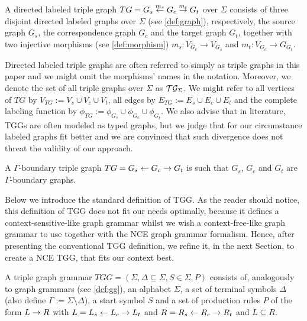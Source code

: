 \documentclass[runningheads]{llncs}
\begin{document}
\begin{definition}
	A directed labeled triple graph $TG = G_s \overset{m_s}{\leftarrow} G_c \overset{m_t}{\rightarrow} G_t$ over $\Sigma$ consists of three disjoint directed labeled graphs over $\Sigma$ (see \ref{def:graph}), respectively, the source graph $G_s$, the correspondence graph $G_c$ and the target graph $G_t$, together with two injective morphisms (see \ref{def:morphism}) $m_s: V_{G_c} \to V_{G_s}$ and $m_t : V_{G_c} \to G_{G_t}$.
\end{definition}

Directed labeled triple graphs are often referred to simply as triple graphs in this paper and we might omit the morphisms' names in the notation. Moreover, we denote the set of all triple graphs over $\Sigma$ as $\mathcal{TG}_{\Sigma}$. We might refer to all vertices of $TG$ by $V_{TG}:= V_s \cup V_c \cup V_t$, all edges by $E_{TG}:= E_s \cup E_c \cup E_t$ and the complete labeling function by $\phi_{TG}:= \phi_{G_s} \cup \phi_{G_c} \cup \phi_{G_t}$. We also advise that in literature, TGGs are often modeled as typed graphs, but we judge that for our circumstance labeled graphs fit better and we are convinced that such divergence does not threat the validity of our approach.

\begin{definition}
	A $\Gamma\text{-boundary}$ triple graph $TG = G_s \overset{}{\leftarrow} G_c \overset{}{\rightarrow} G_t$ is such that $G_s$, $G_c$ and $G_t$ are $\Gamma\text{-boundary}$ graphs.
\end{definition}

Below we introduce the standard definition of TGG. As the reader should notice, this definition of TGG does not fit our needs optimally, because it defines a context-sensitive-like graph grammar whilst we wish a context-free-like graph grammar to use together with the NCE graph grammar formalism. Hence, after presenting the conventional TGG definition, we refine it, in the next Section, to create a NCE TGG, that fits our context best.

\begin{definition}
	\label{def:stgg}
	A triple graph grammar $TGG = (\Sigma, \Delta \subseteq \Sigma, S \in \Sigma, P)$ consists of, analogously to graph grammars (see \ref{def:gg}), an alphabet $\Sigma$, a set of terminal symbols $\Delta$ (also define $\Gamma := \Sigma \setminus \Delta$), a start symbol $S$ and a set of production rules $P$ of the form $L \to R$ with $L = L_s \overset{}{\leftarrow} L_c \overset{}{\rightarrow} L_t$ and $R = R_s \overset{}{\leftarrow} R_c \overset{}{\rightarrow} R_t$ and $L \subseteq R$.
\end{definition}
\end{document}

